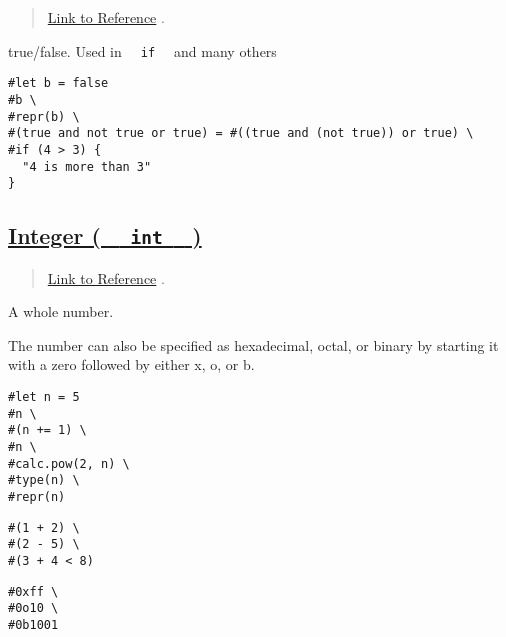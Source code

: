 \begin{quote}
\href{https://typst.app/docs/reference/foundations/bool/}{Link to
Reference} .
\end{quote}

true/false. Used in \texttt{\ }{\texttt{\ if\ }}\texttt{\ } and many
others

\begin{verbatim}
#let b = false
#b \
#repr(b) \
#(true and not true or true) = #((true and (not true)) or true) \
#if (4 > 3) {
  "4 is more than 3"
}
\end{verbatim}

\pandocbounded{}

\subsection{\texorpdfstring{\hyperref[integer-int]{Integer (
\texttt{\ }{\texttt{\ int\ }}\texttt{\ }
)}}{Integer (   int   )}}\label{integer-int}

\begin{quote}
\href{https://typst.app/docs/reference/foundations/int/}{Link to
Reference} .
\end{quote}

A whole number.

The number can also be specified as hexadecimal, octal, or binary by
starting it with a zero followed by either x, o, or b.

\begin{verbatim}
#let n = 5
#n \
#(n += 1) \
#n \
#calc.pow(2, n) \
#type(n) \
#repr(n)
\end{verbatim}

\pandocbounded{}

\begin{verbatim}
#(1 + 2) \
#(2 - 5) \
#(3 + 4 < 8)
\end{verbatim}

\pandocbounded{}

\begin{verbatim}
#0xff \
#0o10 \
#0b1001
\end{verbatim}

\pandocbounded{}

